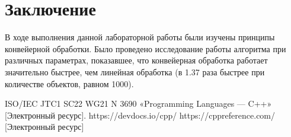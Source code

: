 \documentclass[12pt, a4paper]{report}
\begin{document}
	\chapter*{Заключение}
	\hspace{0.5cm}В ходе выполнения данной лабораторной работы были изучены принципы конвейерной обработки. Было проведено исследование работы алгоритма при различных параметрах, показавшее, что конвейерная обработка работает значительно быстрее, чем линейная обработка (в 1.37 раза быстрее
	при количестве объектов, равном 1000).
	
	\newpage
	
	\begin{thebibliography}{}
	 ISO/IEC JTC1 SC22 WG21 N 3690 «Programming Languages — C++»
	[Электронный ресурс]. https://devdocs.io/cpp/
	 https://cppreference.com/ [Электронный ресурс]
	\end{thebibliography}
\end{document}
